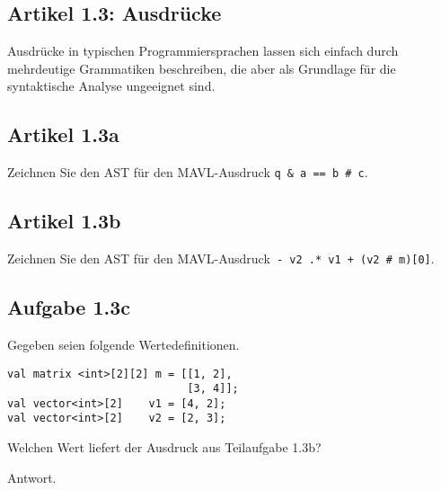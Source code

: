 \documentclass[
  ngerman,
  DIV=14
]{scrartcl}
\begin{document}
\subsection*{Artikel 1.3: Ausdrücke}
Ausdrücke in typischen Programmiersprachen lassen sich einfach durch mehrdeutige Grammatiken beschreiben, die aber als Grundlage für die syntaktische Analyse ungeeignet sind.

\subsection*{Artikel 1.3a}
Zeichnen Sie den AST für den MAVL-Ausdruck \texttt{q \& a == b \# c}.


\bigskip\noindent
{}


\subsection*{Artikel 1.3b}
Zeichnen Sie den AST für den MAVL-Ausdruck\texttt{ - v2 .* v1 + (v2 \# m)[0]}.


\bigskip\noindent
{}

\subsection*{Aufgabe 1.3c}
Gegeben seien folgende Wertedefinitionen.
\begin{lstlisting}
val matrix <int>[2][2] m = [[1, 2],
                            [3, 4]];
val vector<int>[2]    v1 = [4, 2];
val vector<int>[2]    v2 = [2, 3];
\end{lstlisting}
Welchen Wert liefert der Ausdruck aus Teilaufgabe 1.3b?

\bigskip\noindent
Antwort.
\end{document}
